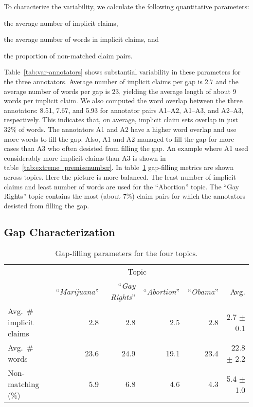To characterize the variability, we calculate the following quantitative parameters:
\begin{enumerate*}[label=(\arabic*)]
\item the average number of implicit claims, 
\item the average number of words in implicit claims, and
\item the proportion of non-matched claim pairs.
\end{enumerate*}
Table~\ref{tab:var-annotators} shows substantial variability in these parameters for the three
annotators. 
Average number of implicit claims per gap is 2.7 and the average number of words per gap is 23, 
yielding the average length of about 9 words per implicit claim. 
We also computed the word overlap between the three annotators: 8.51, 7.67, and 5.93 
for annotator pairs A1--A2, A1--A3, and A2--A3, respectively. 
This indicates that, on average, implicit claim sets overlap in just 32\% of words. 
The annotators A1 and A2 have a higher word overlap and use more words to fill the gap. 
Also, A1 and A2 managed to fill the gap for more cases than A3 who 
often desisted from filling the gap. 
An example where A1 used considerably more implicit claims than A3 is shown in 
table~\ref{tab:extreme_premisenumber}. 
In table~\ref{tab:var-topics} gap-filling metrics are shown across topics. 
Here the picture is more balanced. 
The least number of implicit claims and least number of words are used for the
``Abortion'' topic. The ``Gay Rights'' topic contains the most (about 7\%)
claim pairs for which the annotators desisted from filling the gap. 

\subsection{Gap Characterization}

\begin{table}
{
\begin{center}
\setlength{\tabcolsep}{4.2pt}
\begin{tabular}{@{}lrrrrr@{}}
\toprule
&\multicolumn{4}{c}{Topic}\\
\cmidrule(lr){2-5}
& ``\emph{Marijuana}'' & ``\emph{Gay Rights}'' & ``\emph{Abortion}'' & ``\emph{Obama}'' & Avg. \\
\midrule
Avg.~\#\,implicit claims  & 2.8  & 2.8   & 2.5   &  2.8  &  \phantom{0}2.7 $\pm$ 0.1 \\
Avg.~\#\,words     & 23.6  & 24.9   & 19.1   &  23.4  & 22.8 $\pm$ 2.2\\
Non-matching (\%)     & 5.9  & 6.8   & 4.6   &  4.3  &  \phantom{0}5.4 $\pm$ 1.0\\
\bottomrule
\end{tabular}
\caption{Gap-filling parameters for the four topics.}
\label{tab:var-topics}
\end{center}}
\end{table}

